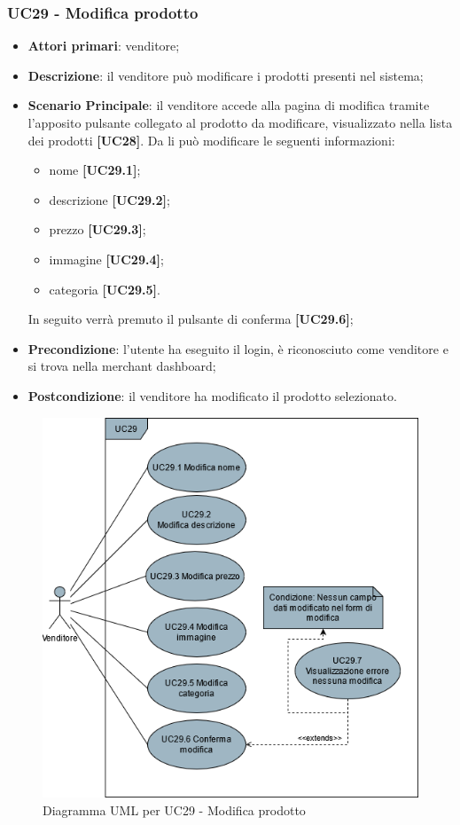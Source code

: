 \subsubsection{UC29 - Modifica prodotto}
\begin{itemize}
\item \textbf{Attori primari}: venditore;
\item \textbf{Descrizione}: il venditore può modificare i prodotti presenti nel sistema;
\item \textbf{Scenario Principale}: il venditore accede alla pagina di modifica tramite l'apposito pulsante collegato al prodotto da modificare, visualizzato nella lista dei prodotti \textbf{[UC28]}. Da li può modificare le seguenti informazioni:
\begin{itemize}
	\item nome \textbf{[UC29.1]};
	\item descrizione \textbf{[UC29.2]};
	\item prezzo \textbf{[UC29.3]};
	\item immagine \textbf{[UC29.4]};
	\item categoria \textbf{[UC29.5]}.
\end{itemize}
In seguito verrà premuto il pulsante di conferma \textbf{[UC29.6]};
\item \textbf{Precondizione}: l'utente ha eseguito il login, è riconosciuto come venditore e si trova nella merchant dashboard;
\item \textbf{Postcondizione}: il venditore ha modificato il prodotto selezionato.
\end{itemize}

\begin{figure}[H]
\centering
\includegraphics[scale=0.6]{res/UseCase/Immagini/ModificaProdotto}
\caption{Diagramma UML per UC29 - Modifica prodotto}
\end{figure}

